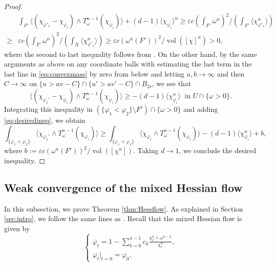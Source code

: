 \documentclass{amsart}
\numberwithin{equation}{section}
\theoremstyle{plain}
\theoremstyle{definition}
\theoremstyle{remark}
\begin{document}
\begin{proof}
    \begin{equation}\label{eq:desiredineq}
        \begin{aligned}
            &\int_{F'}\Big\langle\left(\chi_{\varphi'_1}-\chi_{\varphi_i}\right)\wedge T^{n-1}_\omega(\chi_{\varphi_i})\Big\rangle+(d-1)\langle\chi_{\varphi_i}\rangle^n
            \ge\varepsilon c \left(\int_{F'}\omega^n\right)^2\Bigg/\left(\int_{F'}\big\langle\chi_{\varphi'_1}^n\big\rangle\right)\\
            \ge&\varepsilon c \left(\int_{F'}\omega^n\right)^2\Bigg/\left(\int_X\big\langle\chi_{\varphi'_1}^n\big\rangle\right)\ge\varepsilon c \left(\omega^n(F')\right)^2/\operatorname{vol}([\chi]^n)>0,
        \end{aligned}
    \end{equation}
    where the second to last inequality follows from \cite[Proposition 1.20]{BEGZ}. On the other hand, by the same arguments as above on any coordinate balls with estimating the last term in the last line in \eqref{eq:convexmass} by zero from below and letting $a,b\to\infty$ and then $C\to\infty$ on $\{u>av-C\}\cap\{u'>av'-C\}\cap B_{2r}$, we see that
    \begin{equation*}
        \Big\langle(\chi_{\varphi_1'}-\chi_{\varphi_i})\wedge T^{n-1}_{\omega}(\chi_{\varphi_i})\Big\rangle\ge -(d-1)\langle\chi_{\varphi_i}^n\rangle \ \text{ in } U\cap\{\omega>0\}.
    \end{equation*}
    Integrating this inequality in $(\{\varphi_1<\varphi_2\}\setminus F')\cap\{\omega>0\}$ and adding \eqref{eq:desiredineq}, we obtain
    \begin{equation*}
        \int_{\{\varphi_1<\varphi_2\}}\Big\langle\chi_{\varphi_1'}\wedge T^{n-1}_\omega(\chi_{\varphi_i})\Big\rangle\ge\int_{\{\varphi_1<\varphi_2\}}\Big\langle\chi_{\varphi
        _i}\wedge T^{n-1}_\omega(\chi_{\varphi_i})\Big\rangle-(d-1)\langle\chi_{\varphi_i}^n\rangle+b,
    \end{equation*}
    where $b:=\varepsilon c (\omega^n(F'))^2/\operatorname{vol}([\chi^n])$. Taking $d\to1$, we conclude the desired inequality.
\end{proof}

\subsection{Weak convergence of the mixed Hessian flow}\label{subsec:mixedHessianflow}
In this subsection, we prove Theorem \ref{thm:Hessflow}. As explained in Section \ref{sec:intro}, we follow the same lines as \cite{Mur}. Recall that the mixed Hessian flow is given by
\begin{equation}\label{eq:mixedHessianflowre}
    \begin{cases}
        \dot{\varphi_t}=1-\sum_{k=0}^{n-1}c_k\frac{\chi_t^k\wedge\omega^{n-k}}{\chi_t^n},\\
        \varphi_t|_{t=0}=\varphi_0.
    \end{cases}
\end{equation}
\end{document}
